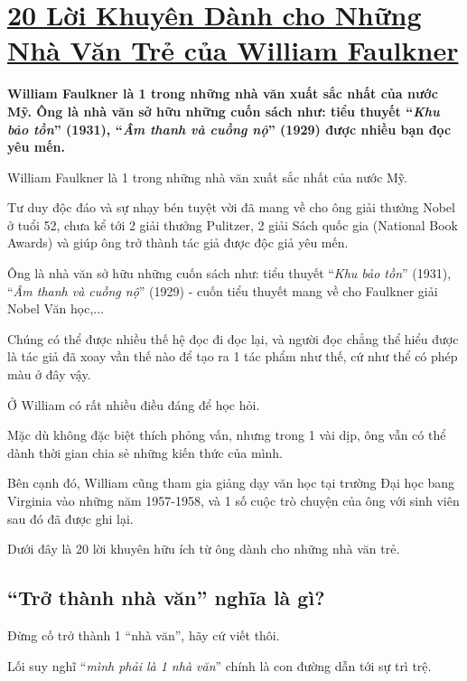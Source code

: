 \documentclass{book}
\numberwithin{equation}{section}
\begin{document}

\chapter{\href{http://tramdoc.vn/tin-tuc/20-loi-khuyen-danh-cho-nhung-nha-van-tre-cua-william-faulkner-nZDe5W.html}{20 Lời Khuyên Dành cho Những Nhà Văn Trẻ của William Faulkner}}

\textbf{William Faulkner là 1 trong những nhà văn xuất sắc nhất của nước Mỹ. Ông là nhà văn sở hữu những cuốn sách như: tiểu thuyết ``\textit{Khu bảo tồn}'' (1931), ``\textit{Âm thanh và cuồng nộ}'' (1929) được nhiều bạn đọc yêu mến.}

%
William Faulkner là 1 trong những nhà văn xuất sắc nhất của nước Mỹ.

Tư duy độc đáo và sự nhạy bén tuyệt vời đã mang về cho ông giải thưởng Nobel ở tuổi 52, chưa kể tới 2 giải thưởng Pulitzer, 2 giải Sách quốc gia (National Book Awards) và giúp ông trở thành tác giả được độc giả yêu mến.

Ông là nhà văn sở hữu những cuốn sách như: tiểu thuyết ``\textit{Khu bảo tồn}'' (1931), ``\textit{Âm thanh và cuồng nộ}'' (1929) - cuốn tiểu thuyết mang về cho Faulkner giải Nobel Văn học,$\ldots$

Chúng có thể được nhiều thế hệ đọc đi đọc lại, và người đọc chẳng thể hiểu được là tác giả đã xoay vần thế nào để tạo ra 1 tác phẩm như thế, cứ như thể có phép màu ở đây vậy.

Ở William có rất nhiều điều đáng để học hỏi.

Mặc dù không đặc biệt thích phỏng vấn, nhưng trong 1 vài dịp, ông vẫn có thể dành thời gian chia sẻ những kiến thức của mình.

Bên cạnh đó, William cũng tham gia giảng dạy văn học tại trường Đại học bang Virginia vào những năm 1957-1958, và 1 số cuộc trò chuyện của ông với sinh viên sau đó đã được ghi lại.

Dưới đây là 20 lời khuyên hữu ích từ ông dành cho những nhà văn trẻ.

\section{``Trở thành nhà văn'' nghĩa là gì?}
Đừng cố trở thành 1 ``nhà văn'', hãy cứ viết thôi.

Lối suy nghĩ ``\textit{mình phải là 1 nhà văn}'' chính là con đường dẫn tới sự trì trệ.
\end{document}

